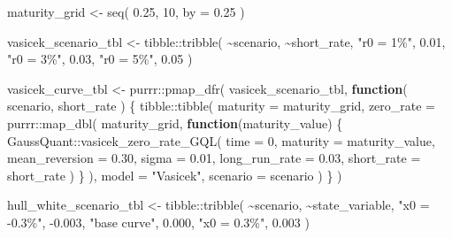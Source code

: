 \documentclass[
  letterpaper,
  DIV=11,
  numbers=noendperiod]{scrreprt}
\newenvironment{Shaded}{\begin{snugshade}}{\end{snugshade}}
\newcommand{\AttributeTok}[1]{\textcolor[rgb]{0.40,0.45,0.13}{#1}}
\newcommand{\ControlFlowTok}[1]{\textcolor[rgb]{0.00,0.23,0.31}{\textbf{#1}}}
\newcommand{\DecValTok}[1]{\textcolor[rgb]{0.68,0.00,0.00}{#1}}
\newcommand{\FloatTok}[1]{\textcolor[rgb]{0.68,0.00,0.00}{#1}}
\newcommand{\FunctionTok}[1]{\textcolor[rgb]{0.28,0.35,0.67}{#1}}
\newcommand{\NormalTok}[1]{\textcolor[rgb]{0.00,0.23,0.31}{#1}}
\newcommand{\OtherTok}[1]{\textcolor[rgb]{0.00,0.23,0.31}{#1}}
\newcommand{\SpecialCharTok}[1]{\textcolor[rgb]{0.37,0.37,0.37}{#1}}
\newcommand{\StringTok}[1]{\textcolor[rgb]{0.13,0.47,0.30}{#1}}
\begin{document}
\begin{Shaded}
\begin{Highlighting}[]
\NormalTok{maturity\_grid }\OtherTok{\textless{}{-}} \FunctionTok{seq}\NormalTok{(}
  \FloatTok{0.25}\NormalTok{,}
  \DecValTok{10}\NormalTok{,}
  \AttributeTok{by =} \FloatTok{0.25}
\NormalTok{)}

\NormalTok{vasicek\_scenario\_tbl }\OtherTok{\textless{}{-}}\NormalTok{ tibble}\SpecialCharTok{::}\FunctionTok{tribble}\NormalTok{(}
  \SpecialCharTok{\textasciitilde{}}\NormalTok{scenario,     }\SpecialCharTok{\textasciitilde{}}\NormalTok{short\_rate,}
  \StringTok{"r0 = 1\%"}\NormalTok{,      }\FloatTok{0.01}\NormalTok{,}
  \StringTok{"r0 = 3\%"}\NormalTok{,      }\FloatTok{0.03}\NormalTok{,}
  \StringTok{"r0 = 5\%"}\NormalTok{,      }\FloatTok{0.05}
\NormalTok{)}

\NormalTok{vasicek\_curve\_tbl }\OtherTok{\textless{}{-}}\NormalTok{ purrr}\SpecialCharTok{::}\FunctionTok{pmap\_dfr}\NormalTok{(}
\NormalTok{  vasicek\_scenario\_tbl,}
  \ControlFlowTok{function}\NormalTok{(}
\NormalTok{    scenario,}
\NormalTok{    short\_rate}
\NormalTok{  ) \{}
\NormalTok{    tibble}\SpecialCharTok{::}\FunctionTok{tibble}\NormalTok{(}
      \AttributeTok{maturity =}\NormalTok{ maturity\_grid,}
      \AttributeTok{zero\_rate =}\NormalTok{ purrr}\SpecialCharTok{::}\FunctionTok{map\_dbl}\NormalTok{(}
\NormalTok{        maturity\_grid,}
        \ControlFlowTok{function}\NormalTok{(maturity\_value) \{}
\NormalTok{          GaussQuant}\SpecialCharTok{::}\FunctionTok{vasicek\_zero\_rate\_GQL}\NormalTok{(}
            \AttributeTok{time =} \DecValTok{0}\NormalTok{,}
            \AttributeTok{maturity =}\NormalTok{ maturity\_value,}
            \AttributeTok{mean\_reversion =} \FloatTok{0.30}\NormalTok{,}
            \AttributeTok{sigma =} \FloatTok{0.01}\NormalTok{,}
            \AttributeTok{long\_run\_rate =} \FloatTok{0.03}\NormalTok{,}
            \AttributeTok{short\_rate =}\NormalTok{ short\_rate}
\NormalTok{          )}
\NormalTok{        \}}
\NormalTok{      ),}
      \AttributeTok{model =} \StringTok{"Vasicek"}\NormalTok{,}
      \AttributeTok{scenario =}\NormalTok{ scenario}
\NormalTok{    )}
\NormalTok{  \}}
\NormalTok{)}

\NormalTok{hull\_white\_scenario\_tbl }\OtherTok{\textless{}{-}}\NormalTok{ tibble}\SpecialCharTok{::}\FunctionTok{tribble}\NormalTok{(}
  \SpecialCharTok{\textasciitilde{}}\NormalTok{scenario,       }\SpecialCharTok{\textasciitilde{}}\NormalTok{state\_variable,}
  \StringTok{"x0 = {-}0.3\%"}\NormalTok{,    }\SpecialCharTok{{-}}\FloatTok{0.003}\NormalTok{,}
  \StringTok{"base curve"}\NormalTok{,     }\FloatTok{0.000}\NormalTok{,}
  \StringTok{"x0 = 0.3\%"}\NormalTok{,      }\FloatTok{0.003}
\NormalTok{)}


\end{Highlighting}
\end{Shaded}
\end{document}
